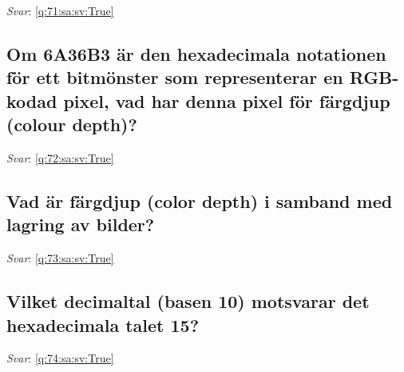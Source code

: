 \documentclass[a4paper,11pt,oneside]{article}
\begin{document}
\begin{sloppypar}
\noindent\makebox[\textwidth]{\hrulefill}

\vspace{1cm}

\textit{Svar}: \autoref{q:71:sa:sv:True}



\subsection{Om 6A36B3 \"ar den hexadecimala notationen f\"or ett bitm\"onster som representerar en RGB-kodad pixel, vad har denna pixel f\"or f\"argdjup (colour depth)?}

\label{q:72:sa:sv:False}

\vspace{2cm}

\noindent\makebox[\textwidth]{\hrulefill}

\vspace{1cm}

\textit{Svar}: \autoref{q:72:sa:sv:True}



\subsection{Vad \"ar f\"argdjup (color depth) i samband med lagring av bilder?}

\label{q:73:sa:sv:False}

\vspace{2cm}

\noindent\makebox[\textwidth]{\hrulefill}

\vspace{1cm}

\textit{Svar}: \autoref{q:73:sa:sv:True}



\subsection{Vilket decimaltal (basen 10) motsvarar det hexadecimala talet 15?}

\label{q:74:sa:sv:False}

\vspace{2cm}

\noindent\makebox[\textwidth]{\hrulefill}

\vspace{1cm}

\textit{Svar}: \autoref{q:74:sa:sv:True}




\end{sloppypar}
\end{document}
